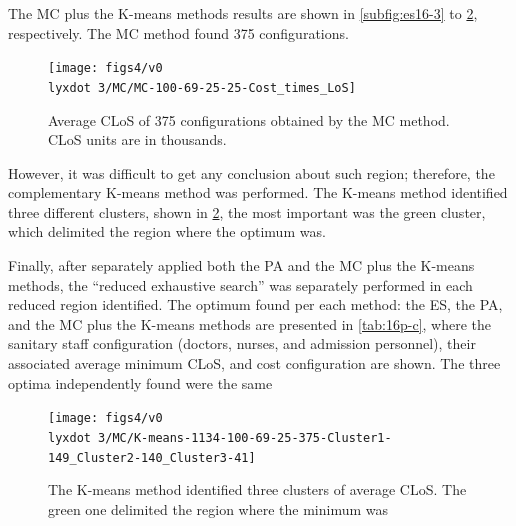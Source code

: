 \documentclass[11pt]{article} %
\begin{document}
The MC plus the K-means methods results are shown in \ref{subfig:es16-3}
to \ref{subfig:km16-3}, respectively. The MC method found 375 configurations.
\begin{figure}[H]
\centering{}\texttt{[image: figs4/v0\\lyxdot 3/MC/MC-100-69-25-25-Cost\_times\_LoS]}\caption{Average CLoS of 375 configurations obtained by the MC method. CLoS
units are in thousands.\label{subfig:mc16-3}}
\end{figure}
 However, it was difficult to get any conclusion about such region;
therefore, the complementary K-means method was performed. The K-means
method identified three different clusters, shown in \ref{subfig:km16-3},
the most important was the green cluster, which delimited the region
where the optimum was.

Finally, after separately applied both the PA and the MC plus the
K-means methods, the \textquotedblleft{}reduced exhaustive search\textquotedblright{}
was separately performed in each reduced region identified. The optimum
found per each method: the ES, the PA, and the MC plus the K-means
methods are presented in \ref{tab:16p-c}, where the sanitary staff
configuration (doctors, nurses, and admission personnel), their associated
average minimum CLoS, and cost configuration are shown. The three
optima independently found were the same
\begin{figure}[H]
\begin{centering}
\texttt{[image: figs4/v0\\lyxdot 3/MC/K-means-1134-100-69-25-375-Cluster1-149\_Cluster2-140\_Cluster3-41]}
\par\end{centering}

\caption{The K-means method identified three clusters of average CLoS. The
green one delimited the region where the minimum was \label{subfig:km16-3}}
\end{figure}
\end{document}
